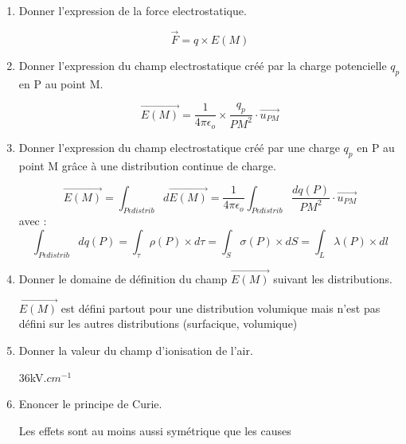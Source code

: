 \documentclass{article}
\begin{document}
\begin{enumerate}[label=\arabic{enumi} - , left=0pt, itemsep=1em]
    \item Donner l'expression de la force electrostatique. \par
    \begin{solution}
          \[ \vec{F} = q \times E(M)\]
    \end{solution}

    \item Donner l'expression du champ electrostatique créé par la charge potencielle $q_p$ en P au point M. \par
    \begin{solution}
          \[ \vec{E(M)} = \frac{1}{4 \pi \epsilon_o} \times \frac{q_p}{PM^2} \cdot \vec{u_{PM}} \]
    \end{solution}

    \item Donner l'expression du champ electrostatique créé par une charge $q_p$ en P au point M grâce à une distribution continue de charge. \par
    \begin{solution}
          \[ \vec{E(M)} = \int_{P \epsilon distrib} d\vec{E(M)} = \frac{1}{4 \pi \epsilon_o} \int_{P \epsilon distrib} \frac{dq(P)}{PM^2} \cdot \vec{u_{PM}} \]
          avec : 
          \[ \int_{P \epsilon distrib} dq(P)  = \int_\tau \rho(P) \times d\tau =\int_S \sigma(P) \times dS = \int_L \lambda(P) \times dl \]   
  
    \end{solution}

    \item Donner le domaine de définition du champ $\vec{E(M)}$ suivant les distributions. \par
    \begin{solution}
     $\vec{E(M)}$ est défini partout pour une distribution volumique mais n'est pas défini sur les autres distributions (surfacique, volumique)
  
    \end{solution}

    \item Donner la valeur du champ d'ionisation de l'air. \par
    \begin{solution}
     36kV.$cm^{-1}$
  
    \end{solution}
    
    \item Enoncer le principe de Curie. \par
    \begin{solution}
     Les effets sont au moins aussi symétrique que les causes
     \end{solution}


\end{enumerate}
\end{document}
